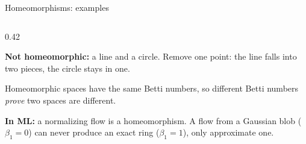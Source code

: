 \documentclass[10pt,aspectratio=169]{beamer}
\begin{document}
\begin{frame}{Homeomorphisms: examples}
\begin{columns}[T,onlytextwidth]
\begin{column}{0.42\textwidth}
                \vspace{0.4em}
                \footnotesize\raggedright
                \textbf{Not homeomorphic:} a line and a circle. Remove one point: the line
                falls into two pieces, the circle stays in one.

                \vspace{0.3em}
                \alert{Homeomorphic spaces have the same Betti numbers}, so different
                Betti numbers \emph{prove} two spaces are different.

                \vspace{0.3em}
                \textbf{In ML:} a normalizing flow is a homeomorphism. A flow from a
                Gaussian blob ($\beta_1=0$) can never produce an exact ring ($\beta_1=1$),
                only approximate one.
            \end{column}
        \end{columns}
    \end{frame}
\end{document}
